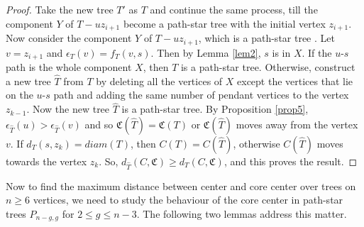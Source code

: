 \documentclass[11pt]{article}
\begin{document}
\begin{proof}
Take the new tree $T'$ as $T$ and continue the same process, till the component $Y$ of $T-uz_{i+1}$ become a path-star tree with the initial vertex $z_{i+1}$. Now consider the component $Y$ of $T-uz_{i+1}$, which is a path-star tree . Let $v=z_{i+1}$ and $\epsilon_{T}(v)=f_T(v,s)$. Then by Lemma \ref{lem2}, $s$ is in $X$. If  the $u$-$s$ path is the whole component $X$, then $T$ is a path-star tree. Otherwise, construct a new tree $\hat{T}$ from $T$ by deleting all the vertices of $X$ except the vertices that lie on the $u$-$s$ path and adding the same number of pendant vertices to the vertex $z_{k-1}$. Now the new tree $\hat{T}$ is a path-star tree. By Proposition \ref{prop5}, $\epsilon_{\hat{T}}(u)>\epsilon_{\hat{T}}(v)$ and so $\mathfrak{C}(\hat{T})=\mathfrak{C}(T)$ or $\mathfrak{C}(\hat{T})$ moves away from the vertex $v$. If $d_T(s,z_k)=diam(T)$, then $C(T)=C(\hat{T})$, otherwise $C(\hat{T})$ moves towards the vertex $z_k$. So, $d_{\hat{T}}(C,\mathfrak{C})\geq d_T(C,\mathfrak{C})$, and this proves the result.
\end{proof}

Now to find the maximum  distance between center and core center over trees on $n\geq 6$ vertices, we need to study the behaviour of the core center in path-star trees $P_{n-g,g}$ for $2\leq g\leq n-3$. The following two lemmas address this matter.
\end{document}
